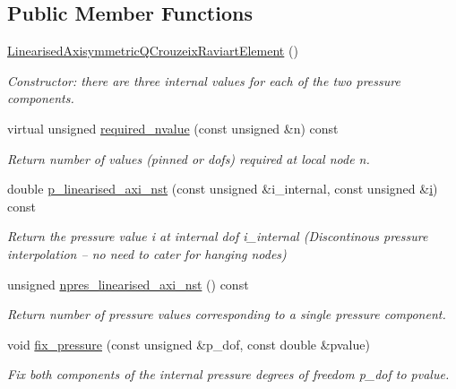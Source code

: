 \subsection*{Public Member Functions}
\begin{DoxyCompactItemize}
\item 
\hyperlink{classoomph_1_1LinearisedAxisymmetricQCrouzeixRaviartElement_a7661fbccf605f3affb81249aca99c19f}{Linearised\+Axisymmetric\+Q\+Crouzeix\+Raviart\+Element} ()
\begin{DoxyCompactList}\small\item\em Constructor\+: there are three internal values for each of the two pressure components. \end{DoxyCompactList}\item 
virtual unsigned \hyperlink{classoomph_1_1LinearisedAxisymmetricQCrouzeixRaviartElement_a98093f738bed5e37fd68a3c2e841963d}{required\+\_\+nvalue} (const unsigned \&n) const
\begin{DoxyCompactList}\small\item\em Return number of values (pinned or dofs) required at local node n. \end{DoxyCompactList}\item 
double \hyperlink{classoomph_1_1LinearisedAxisymmetricQCrouzeixRaviartElement_a63b75f226201b74bd4141674bcb39286}{p\+\_\+linearised\+\_\+axi\+\_\+nst} (const unsigned \&i\+\_\+internal, const unsigned \&\hyperlink{cfortran_8h_adb50e893b86b3e55e751a42eab3cba82}{i}) const
\begin{DoxyCompactList}\small\item\em Return the pressure value i at internal dof i\+\_\+internal (Discontinous pressure interpolation -- no need to cater for hanging nodes) \end{DoxyCompactList}\item 
unsigned \hyperlink{classoomph_1_1LinearisedAxisymmetricQCrouzeixRaviartElement_abeb1140cee07405cbaa6b3038e1ec2de}{npres\+\_\+linearised\+\_\+axi\+\_\+nst} () const
\begin{DoxyCompactList}\small\item\em Return number of pressure values corresponding to a single pressure component. \end{DoxyCompactList}\item 
void \hyperlink{classoomph_1_1LinearisedAxisymmetricQCrouzeixRaviartElement_aad815f117651a5d45360685ca30bcc98}{fix\+\_\+pressure} (const unsigned \&p\+\_\+dof, const double \&pvalue)
\begin{DoxyCompactList}\small\item\em Fix both components of the internal pressure degrees of freedom p\+\_\+dof to pvalue. \end{DoxyCompactList}\item 

\end{DoxyCompactItemize}
